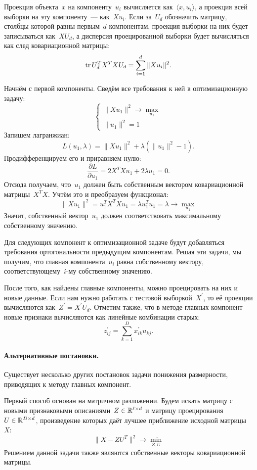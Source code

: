 \documentclass[12pt,fleqn]{article}
\begin{document}
	Проекция объекта~$x$ на компоненту~$u_i$ вычисляется как~$\langle x, u_i \rangle$,
	а проекция всей выборки на эту компоненту~--- как~$X u_i$.
	Если за~$U_d$ обозначить матрицу, столбцы которой равны первым~$d$ компонентам,
	проекция выборки на них будет записываться как~$X U_d$,
	а дисперсия проецированной выборки будет вычисляться как след ковариационной матрицы:
	\[
	\mathop{\mathrm{tr}} U_d^T X^T X U_d
	=
	\sum_{i = 1}^{d} \|X u_i\|^2.
	\]
	
	Начнём с первой компоненты.
	Сведём все требования к ней в оптимизационную задачу:
	\[
	\begin{cases}
	\| X u_1 \|^2 \to \max_{u_1} \\
	\|u_1\|^2 = 1
	\end{cases}
	\]
	Запишем лагранжиан:
	\[
	L(u_1, \lambda)
	=
	\| X u_1 \|^2 + \lambda (\|u_1\|^2 - 1).
	\]
	Продифференцируем его и приравняем нулю:
	\[
	\frac{\partial L}{\partial u_1}
	=
	2 X^T Xu_1 + 2 \lambda u_1
	=
	0.
	\]
	Отсюда получаем, что~$u_1$ должен быть собственным вектором ковариационной матрицы~$X^T X$.
	Учтём это и преобразуем функционал:
	\[
	\| X u_1 \|^2
	=
	u_1^T X^T X u_1
	=
	\lambda u_1^T u_1
	=
	\lambda
	\to
	\max_{u_1}
	\]
	Значит, собственный вектор~$u_1$ должен соответствовать максимальному
	собственному значению.
	
	Для следующих компонент к оптимизационной задаче будут добавляться требования
	ортогональности предыдущим компонентам.
	Решая эти задачи, мы получим, что главная компонента~$u_i$
	равна собственному вектору, соответствующему~$i$-му собственному значению.
	
	После того, как найдены главные компоненты, можно проецировать на них и новые данные.
	Если нам нужно работать с тестовой выборкой~$X^\prime$, то её проекции вычисляются как~$Z^\prime = X^\prime U_d$.
	Отметим также, что в методе главных компонент новые признаки вычисляются как линейные комбинации старых:
	\[
	z^{\prime}_{ij}
	=
	\sum_{k = 1}^{D}
	x^{\prime}_{ik} u_{kj}.
	\]
	
	\paragraph{Альтернативные постановки.}
	
	Существует несколько других постановок задачи понижения размерности,
	приводящих к методу главных компонент.
	
	Первый способ основан на матричном разложении.
	Будем искать матрицу с новыми признаковыми описаниями~$Z \in \RR^{\ell \times d}$
	и матрицу проецирования~$U \in \RR^{D \times d}$,
	произведение которых даёт лучшее приближение исходной матрицы~$X$:
	\[
	\| X - Z U^T \|^2
	\to
	\min_{Z, U}
	\]
	Решением данной задачи также являются собственные векторы ковариационной матрицы.
	
\end{document}
